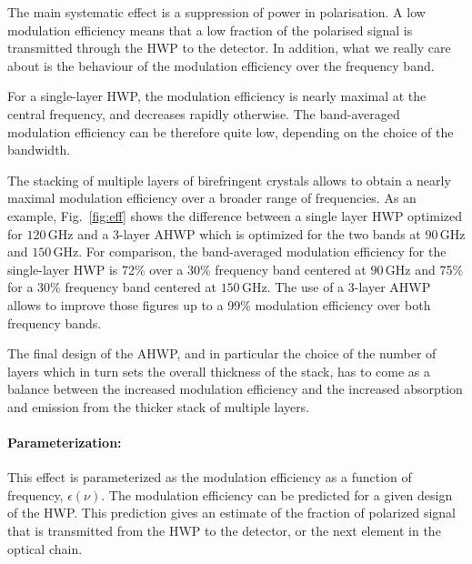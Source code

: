 The main systematic effect is a suppression of power in polarisation. A low modulation efficiency means that a low fraction of the polarised signal is transmitted through the HWP to the detector. In addition, what we really care about is the behaviour of the modulation efficiency over the frequency band.

For a single-layer HWP, the modulation efficiency is nearly maximal at the central frequency, and decreases rapidly otherwise. The band-averaged modulation efficiency can be therefore quite low, depending on the choice of the bandwidth.

The stacking of multiple layers of birefringent crystals allows to obtain a nearly maximal modulation efficiency over a broader range of frequencies. As an example, Fig.~\ref{fig:eff} shows the difference between a single layer HWP optimized for $120\,\mathrm{GHz}$ and a 3-layer AHWP which is optimized for the two bands at $90\,\mathrm{GHz}$ and $150\,\mathrm{GHz}$. For comparison, the band-averaged modulation efficiency for the single-layer HWP is 72\% over a 30\% frequency band centered at $90\,\mathrm{GHz}$ and 75\% for a 30\% frequency band centered at $150\,\mathrm{GHz}$. The use of a 3-layer AHWP allows to improve those figures up to a 99\% modulation efficiency over both frequency bands.

The final design of the AHWP, and in particular the choice of the number of layers which in turn sets the overall thickness of the stack, has to come as a balance between the increased modulation efficiency and the increased absorption and emission from the thicker stack of multiple layers.

\paragraph{Parameterization:}
This effect is parameterized as the modulation efficiency as a function of frequency, $\epsilon (\nu)$. The modulation efficiency can be predicted for a given design of the HWP. This prediction gives an estimate of the fraction of polarized signal that is transmitted from the HWP to the detector, or the next element in the optical chain.


